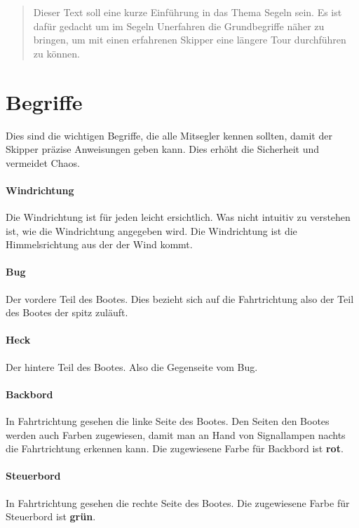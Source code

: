 \documentclass[12pt]{article}
\begin{document}
\maketitle

\begin{abstract}
Dieser Text soll eine kurze Einführung in das Thema Segeln sein. Es ist dafür gedacht um im Segeln Unerfahren die Grundbegriffe näher zu bringen, um mit einen erfahrenen Skipper eine längere Tour durchführen zu können.
\end{abstract}

\section{Begriffe}
Dies sind die wichtigen Begriffe, die alle Mitsegler kennen sollten, damit der Skipper präzise Anweisungen geben kann. Dies erhöht die Sicherheit und vermeidet Chaos.

\paragraph{Windrichtung}
Die Windrichtung ist für jeden leicht ersichtlich. Was nicht intuitiv zu verstehen ist, wie die Windrichtung angegeben wird. Die Windrichtung ist die Himmelsrichtung aus der der Wind kommt.

\paragraph{Bug}
Der vordere Teil des Bootes. Dies bezieht sich auf die Fahrtrichtung also der Teil des Bootes der spitz zuläuft.

\paragraph{Heck}
Der hintere Teil des Bootes. Also die Gegenseite vom Bug.

\paragraph{Backbord}
In Fahrtrichtung gesehen die linke Seite des Bootes. Den Seiten den Bootes werden auch Farben zugewiesen, damit man an Hand von Signallampen nachts die Fahrtrichtung erkennen kann. Die zugewiesene Farbe für Backbord ist \textbf{rot}.

\paragraph{Steuerbord}
In Fahrtrichtung gesehen die rechte Seite des Bootes. Die zugewiesene Farbe für Steuerbord ist \textbf{grün}.
\end{document}
